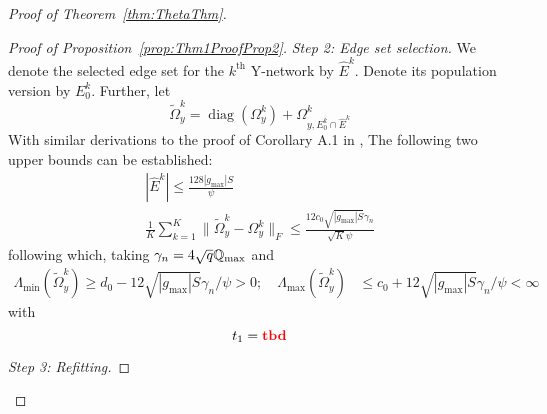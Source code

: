 \documentclass[12pt, letterpaper]{article}
\DeclareMathOperator*{\diag}{diag }
\numberwithin{equation}{section}
\begin{document}
\begin{proof}[Proof of Theorem~\ref{thm:ThetaThm}]
\begin{proof}[Proof of Proposition~\ref{prop:Thm1ProofProp2}]
{\it Step 2: Edge set selection.} We denote the selected edge set for the $k^\text{th}$ Y-network by $\hat E^k$. Denote its population version by $E_0^k$. Further, let
%
$$
\tilde \Omega_y^k = \diag (\Omega_y^k) + \Omega_{y, E_0^k \cap \hat E^k}^k
$$
%
With similar derivations to the proof of Corollary A.1 in \cite{MaMichailidis15}, The following two upper bounds can be established:
%
\begin{align}
| \hat E^k | \leq \frac{ 128 | g_{\max} | S }{\psi}\\
\frac{1}{K} \sum_{k=1}^K \| \tilde \Omega_y^k - \Omega_y^k \|_F \leq
\frac{12 c_0 \sqrt{| g_{\max}| S} \gamma_n} {\sqrt K \psi}
\end{align}
%
following which, taking $\gamma_n = 4 \sqrt q {\mathbb{Q}}_{\max}$ and 
%
\begin{align}
\Lambda_{\min} ( \tilde \Omega_y^k) \geq d_0 - 12 \sqrt{| g_{\max}| S} \gamma_n / \psi > 0; \quad
\Lambda_{\max} ( \tilde \Omega_y^k) & \leq c_0 + 12 \sqrt{| g_{\max}| S} \gamma_n / \psi < \infty
\end{align}
%
with
%
$$
t_1 = {\color{red} \bf tbd}
$$

{\it Step 3: Refitting.}

\end{proof}


\end{proof}
\end{document}
